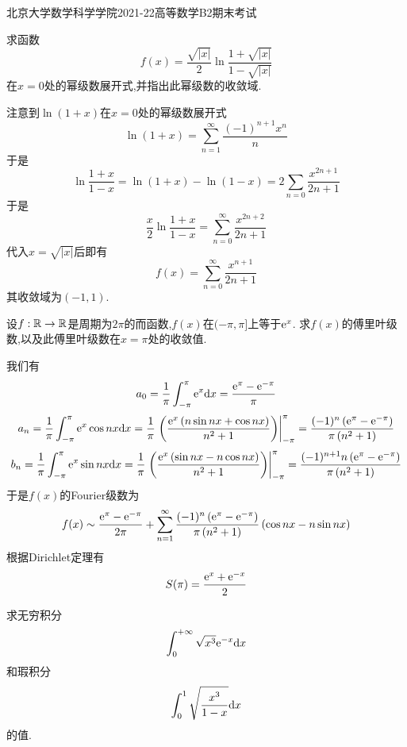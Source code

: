 \documentclass{ctexart}
\begin{document}
\pagestyle{empty}
\begin{center}\Large
    北京大学数学科学学院2021-22高等数学B2期末考试
\end{center}
\begin{problem}[1.(10\songti{分})]
    求函数
    \[f(x)=\dfrac{\sqrt{|x|}}{2}\ln\dfrac{1+\sqrt{|x|}}{1-\sqrt{|x|}}\]
    在$x=0$处的幂级数展开式,并指出此幂级数的收敛域.

\end{problem}
\begin{solution}
    注意到$\ln(1+x)$在$x=0$处的幂级数展开式
    \[\ln(1+x)=\sum_{n=1}^{\infty}\dfrac{(-1)^{n+1}x^n}{n}\]
    于是
    \[\ln\dfrac{1+x}{1-x}=\ln(1+x)-\ln(1-x)=2\sum_{n=0}\dfrac{x^{2n+1}}{2n+1}\]
    于是
    \[\dfrac{x}{2}\ln\dfrac{1+x}{1-x}=\sum_{n=0}^{\infty}\dfrac{x^{2n+2}}{2n+1}\]
    代入$x=\sqrt{|x|}$后即有
    \[f(x)=\sum_{n=0}^{\infty}\dfrac{x^{n+1}}{2n+1}\]
    其收敛域为$(-1,1)$.
\end{solution}
\begin{problem}[2.(15\songti{分})]
    设$f:\mathbb{R}\to\mathbb{R}$是周期为$2\pi$的而函数,$f(x)$在$(-\pi,\pi]$上等于$\mathrm{e}^x$.%
    求$f(x)$的傅里叶级数,以及此傅里叶级数在$x=\pi$处的收敛值.

\end{problem}
\begin{solution}
    我们有
    \[a_0=\dfrac{1}{\pi}\int_{-\pi}^{\pi}\mathrm{e}^{x}\mathrm{d} x=\dfrac{\mathrm{e}^{\pi}-\mathrm{e}^{-\pi}}{\pi}\]
    \[a_n=\dfrac{1}{\pi}\int_{-\pi}^{\pi}\mathrm{e}^{x}\cos nx\mathrm{d} x 
    =\dfrac{1}{\pi}\left.\left(\dfrac{\mathrm{e}^x\left(n\sin nx+\cos nx\right)}{n^2+1}\right)\right|_{-\pi}^{\pi} 
    =\dfrac{(-1)^n\left(\mathrm{e}^{\pi}-\mathrm{e}^{-\pi}\right)}{\pi\left(n^2+1\right)}\]
    \[b_n=\dfrac{1}{\pi}\int_{-\pi}^{\pi}\mathrm{e}^{x}\sin nx\mathrm{d} x 
    =\dfrac{1}{\pi}\left.\left(\dfrac{\mathrm{e}^x\left(\sin nx-n\cos nx\right)}{n^2+1}\right)\right|_{-\pi}^{\pi} 
    =\dfrac{(-1)^{n+1}n\left(\mathrm{e}^{\pi}-\mathrm{e}^{-\pi}\right)}{\pi\left(n^2+1\right)}\]
    于是$f(x)$的Fourier级数为
    \[f(x)\sim\dfrac{\mathrm{e}^{\pi}-\mathrm{e}^{-\pi}}{2\pi}+\sum_{n=1}^{\infty}\dfrac{(-1)^n\left(\mathrm{e}^{\pi}-\mathrm{e}^{-\pi}\right)}{\pi\left(n^2+1\right)}\left(\cos nx-n\sin nx\right)\]
    根据Dirichlet定理有
    \[S(\pi)=\dfrac{\mathrm{e}^x+\mathrm{e}^{-x}}{2}\]

\end{solution}
\begin{problem}[3.(10\songti{分})]
    求无穷积分
    \[\int_0^{+\infty}\sqrt{x^3}\mathrm{e}^{-x}\mathrm{d} x\]
    和瑕积分
    \[\int_0^1\sqrt{\dfrac{x^3}{1-x}}\mathrm{d} x\]
    的值.

\end{problem}
\end{document}
